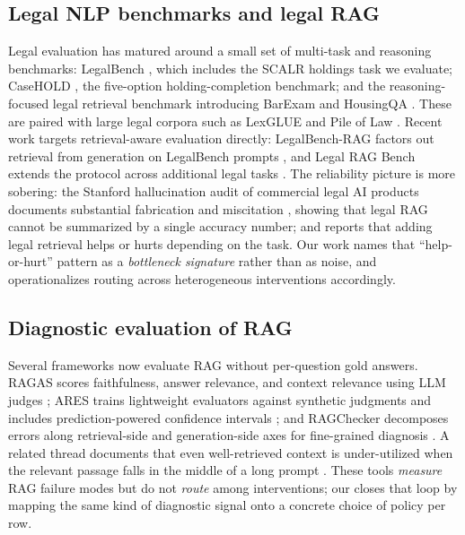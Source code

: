 \subsection{Legal NLP benchmarks and legal RAG}
Legal evaluation has matured around a small set of multi-task and reasoning
benchmarks: LegalBench \citep{guha2023legalbench}, which includes the SCALR
holdings task we evaluate; CaseHOLD \citep{zheng2021casehold}, the
five-option holding-completion benchmark; and the reasoning-focused legal
retrieval benchmark introducing BarExam and HousingQA
\citep{zheng2025legalretrieval}. These are paired with large legal corpora
such as LexGLUE \citep{chalkidis2022lexglue} and Pile of Law
\citep{henderson2022pileoflaw}. Recent work targets retrieval-aware
evaluation directly: LegalBench-RAG factors out retrieval from generation on
LegalBench prompts \citep{pipitone2024legalbenchrag}, and Legal RAG Bench
extends the protocol across additional legal tasks
\citep{butler2026legalragbench}. The reliability picture is more sobering:
the Stanford hallucination audit of commercial legal AI products documents
substantial fabrication and miscitation \citep{magesh2024hallucinations},
showing that legal RAG cannot be summarized by a single accuracy number; and
\citet{vaddi2026smallmodels} reports that adding legal retrieval helps or
hurts depending on the task. Our work names that ``help-or-hurt'' pattern as a
\emph{bottleneck signature} rather than as noise, and operationalizes routing
across heterogeneous interventions accordingly.

\subsection{Diagnostic evaluation of RAG}
Several frameworks now evaluate RAG without per-question gold answers.
RAGAS scores faithfulness, answer relevance, and context relevance using LLM
judges \citep{es2024ragas}; ARES trains lightweight evaluators against
synthetic judgments and includes prediction-powered confidence intervals
\citep{saadfalcon2024ares}; and RAGChecker decomposes errors along
retrieval-side and generation-side axes for fine-grained diagnosis
\citep{ru2024ragchecker}. A related thread documents that even well-retrieved
context is under-utilized when the relevant passage falls in the middle of a
long prompt \citep{liu2024lostmiddle}. These tools \emph{measure} RAG failure
modes but do not \emph{route} among interventions; our \controller{} closes
that loop by mapping the same kind of diagnostic signal onto a concrete
choice of policy per row.
